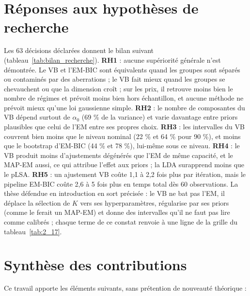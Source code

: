 \section*{Réponses aux hypothèses de recherche}
Les 63 décisions déclarées donnent le bilan suivant (tableau~\ref{tab:bilan_recherche}). \textbf{RH1} : aucune supériorité générale n'est démontrée. Le VB et l'EM-BIC sont équivalents quand les groupes sont séparés ou contaminés par des aberrations ; le VB fait mieux quand les groupes se chevauchent ou que la dimension croît ; sur les prix, il retrouve moins bien le nombre de régimes et prévoit moins bien hors échantillon, et aucune méthode ne prévoit mieux qu'une loi gaussienne simple. \textbf{RH2} : le nombre de composantes du VB dépend surtout de $\alpha_0$ (69 \% de la variance) et varie davantage entre priors plausibles que celui de l'EM entre ses propres choix. \textbf{RH3} : les intervalles du VB couvrent bien moins que le niveau nominal (22 \% et 64 \% pour 90 \%), et moins que le bootstrap d'EM-BIC (44 \% et 78 \%), lui-même sous ce niveau. \textbf{RH4} : le VB produit moins d'ajustements dégénérés que l'EM de même capacité, et le MAP-EM aussi, ce qui attribue l'effet aux priors ; la LDA surapprend moins que le pLSA. \textbf{RH5} : un ajustement VB coûte 1,1 à 2,2 fois plus par itération, mais le pipeline EM-BIC coûte 2,6 à 5 fois plus en temps total dès 60 observations. La thèse défendue en introduction en sort précisée : le VB ne bat pas l'EM, il déplace la sélection de $K$ vers ses hyperparamètres, régularise par ses priors (comme le ferait un MAP-EM) et donne des intervalles qu'il ne faut pas lire comme calibrés ; chaque terme de ce constat renvoie à une ligne de la grille du tableau~\ref{tab:2_17}.

\section*{Synthèse des contributions}
Ce travail apporte les éléments suivants, sans prétention de nouveauté théorique :

